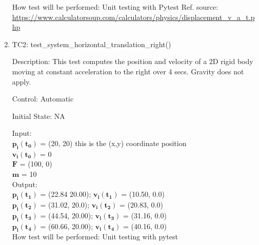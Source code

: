 \documentclass[12pt, titlepage]{article}
\begin{document}
\begin{enumerate}
How test will be performed: Unit testing with Pytest
Ref. source: \url{https://www.calculatorsoup.com/calculators/physics/displacement_v_a_t.php}
					
\item{TC2: test\_system\_horizontal\_translation\_right()\\}

Description: This test computes the position and velocity of a 2D rigid body moving at constant acceleration to the right over 4 secs. Gravity does not apply.
 
Control: Automatic
					
Initial State: NA
					
Input:\\ 
		$\mathbf{p_i}$$\mathbf{(t_0)}$ = (20, 20) this is the (x,y) coordinate position\\
	   $\mathbf{v_i}$$\mathbf{(t_0)}$ = 0\\
	   $\mathbf{F}$$\mathbf{}$ = (100, 0)\\
	   $\mathbf{m}$$ \mathbf{}$ = 10\\ 	   
	  
Output:\\
	    $\mathbf{p_i}$$\mathbf{(t_1)}$ = (22.84 20.00);
		$\mathbf{v_i}$$\mathbf{(t_1)}$ = (10.50, 0.0)\\ 
		$\mathbf{p_i}$$\mathbf{(t_2)}$ = (31.02, 20.0);
		$\mathbf{v_i}$$\mathbf{(t_2)}$ = (20.83, 0.0)\\ 
		$\mathbf{p_i}$$\mathbf{(t_3)}$ = (44.54, 20.00);
		$\mathbf{v_i}$$\mathbf{(t_3)}$ = (31.16, 0.0)\\
		$\mathbf{p_i}$$\mathbf{(t_4)}$ = (60.66, 20.00);
		$\mathbf{v_i}$$\mathbf{(t_4)}$ = (40.16, 0.0)\\  
					
How test will be performed: Unit testing with pytest



\end{enumerate}
\end{document}
